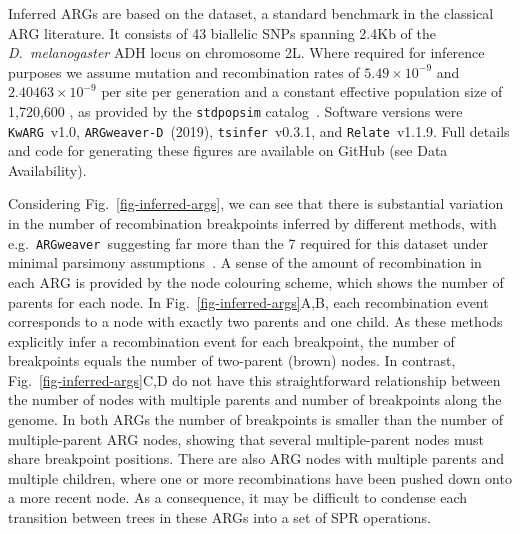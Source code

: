 \documentclass[9pt,twocolumn,twoside]{gsajnl}
\newcommand{\tsinfer}[0]{\texttt{tsinfer}}
\newcommand{\kwarg}[0]{\texttt{KwARG}}
\newcommand{\argweaver}[0]{\texttt{ARGweaver}}
\newcommand{\argweaverD}[0]{\texttt{ARGweaver-D}}
\newcommand{\relate}[0]{\texttt{Relate}}
\begin{document}
Inferred ARGs are based on the \citet{kreitman1983nucleotide} dataset,
a standard benchmark in the classical ARG
literature.
It consists of 43 biallelic SNPs spanning 2.4Kb of the \emph{D.~melanogaster} ADH
locus on chromosome 2L. Where required for inference purposes we assume
mutation and recombination rates of $5.49\times10^{-9}$
and $2.40463\times10^{-9}$ per site per generation
\citep{schrider2013rates,comeron2012many}
and a constant effective population size of 1,720,600 \citep{li2006inferring},
as provided by the \texttt{stdpopsim}
catalog~\citep{adrion2020community,lauterbur2023expanding}.
Software versions were \kwarg~v1.0, \argweaverD~(2019),
\tsinfer~v0.3.1, and \relate~v1.1.9.
Full details and code for generating
these figures are available on GitHub (see Data Availability).

Considering Fig.~\ref{fig-inferred-args}, we can see that
there is substantial variation in the number of recombination breakpoints
inferred by different methods, with e.g.~\argweaver\ suggesting
far more than the 7 required for this dataset under minimal parsimony
assumptions~\citep{song2003parsimonious}.
A sense of the amount of recombination in each ARG is provided by
the node colouring scheme, which shows the number of parents for each node.
In Fig.~\ref{fig-inferred-args}A,B, each recombination event
corresponds to a node with exactly two parents and one child.
As these methods explicitly infer a recombination event for each
breakpoint, the number of breakpoints equals the number of two-parent
(brown) nodes.
In contrast, Fig.~\ref{fig-inferred-args}C,D do not have this
straightforward
relationship between the number of nodes with multiple parents
and number of breakpoints along the genome.
In both ARGs the number of breakpoints is smaller
than the number of multiple-parent ARG nodes, showing
that several multiple-parent nodes must share breakpoint positions.
There are also ARG nodes with multiple parents and multiple children,
where one or more recombinations have been pushed down onto a
more recent node.
As a consequence, it may be difficult to condense each transition between trees
in these ARGs into a set of SPR operations.
\end{document}

